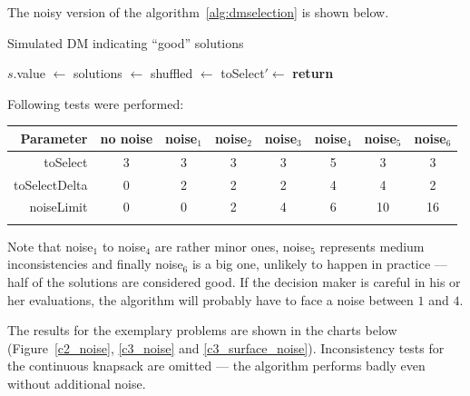 The noisy version of the algorithm~\ref{alg:dmselection} is shown below.
\begin{algorithm}
  \caption{Simulated DM indicating ``good''
    solutions}\label{alg:noisydmselection}
  \begin{algorithmic}[1]
    \State $s.$value $\gets$ 
    \EndFor
    \State solutions $\gets$ 
    \State shuffled $\gets$ 
    \State toSelect$' \gets$ 
    \State \textbf{return} 
    \EndProcedure
  \end{algorithmic}
\end{algorithm}

Following tests were performed:

\begin{tabular}{r c c c c c c c}
  \hline
  Parameter & no noise & noise$_1$ & noise$_2$ & noise$_3$ & noise$_4$ &
  noise$_5$ & noise$_6$ \\
  \hline
  \hline
  toSelect      & 3 & 3 & 3 & 3 & 5 &  3 &  3 \\
  toSelectDelta & 0 & 2 & 2 & 2 & 4 &  4 &  2 \\
  noiseLimit    & 0 & 0 & 2 & 4 & 6 & 10 & 16 \\
  \hline \\
\end{tabular}

Note that noise$_1$ to noise$_4$ are rather minor ones, noise$_5$ represents
medium inconsistencies and finally noise$_6$ is a big one, unlikely to happen
in practice --- half of the solutions are considered good. If the decision
maker is careful in his or her evaluations, the algorithm will probably have
to face a noise between $1$ and $4$.

The results for the exemplary problems are shown in the charts below
(Figure~\ref{c2_noise}, \ref{c3_noise} and
\ref{c3_surface_noise}). Inconsistency tests for the continuous knapsack are
omitted --- the algorithm performs badly even without additional noise.

